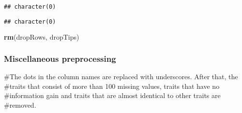 \documentclass[
]{article}
\newenvironment{Shaded}{\begin{snugshade}}{\end{snugshade}}
\newcommand{\KeywordTok}[1]{\textcolor[rgb]{0.13,0.29,0.53}{\textbf{#1}}}
\newcommand{\NormalTok}[1]{#1}
\newcommand{\OperatorTok}[1]{\textcolor[rgb]{0.81,0.36,0.00}{\textbf{#1}}}
\begin{document}
\begin{verbatim}
## character(0)
\end{verbatim}

\begin{Shaded}
\end{Shaded}

\begin{verbatim}
## character(0)
\end{verbatim}

\begin{Shaded}
\begin{Highlighting}[]
\KeywordTok{rm}\NormalTok{(dropRows, dropTips)}
\end{Highlighting}
\end{Shaded}

\hypertarget{miscellaneous-preprocessing}{%
\subsubsection{Miscellaneous
preprocessing}\label{miscellaneous-preprocessing}}

\#The dots in the column names are replaced with underscores. After
that, the \#traits that consist of more than 100 missing values, traits
that have no \#information gain and traits that are almost identical to
other traits are \#removed.
\end{document}

